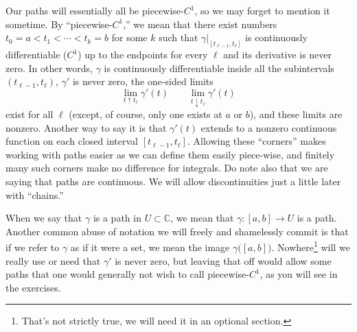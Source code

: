 \documentclass[12pt,openany]{book}
\newcommand{\C}{{\mathbb{C}}}
\newcommand{\myquote}[1]{``#1''}
\theoremstyle{plain}
\theoremstyle{remark}
\theoremstyle{definition}
\theoremstyle{exercise}
\theoremstyle{example}
\begin{document}
Our paths will essentially all be piecewise-$C^1$,
so we may forget to mention it sometime.
By \myquote{piecewise-$C^1$,}
we mean that there exist numbers $t_0 = a < t_1 < \cdots
< t_k = b$ for some $k$ such that $\gamma|_{[t_{\ell-1},t_\ell]}$ is
continuously differentiable ($C^1$) up to
the endpoints for every $\ell$ and its derivative is never zero.
In other words, $\gamma$ is continuously differentiable inside all the
subintervals $(t_{\ell-1},t_\ell)$, $\gamma'$ is never zero, the one-sided limits
\begin{equation*}
\lim_{t \uparrow t_\ell} \gamma'(t) \qquad
\lim_{t \downarrow t_\ell} \gamma'(t)
\end{equation*}
exist for all $\ell$ (except, of course, only one exists at $a$ or $b$),
and these limits are nonzero.
Another way to say it is that $\gamma'(t)$ extends to a nonzero
continuous function on each closed interval $[t_{\ell-1},t_{\ell}]$.
Allowing these \myquote{corners} makes working with paths easier
as we can define them easily piece-wise, and finitely many such corners
make no difference for integrals.
Do note also that we are saying that paths are continuous.  We will allow
discontinuities just a little later with \myquote{chains.}

When we say that $\gamma$ is a path in $U \subset \C$,
we mean that
$\gamma \colon [a,b] \to U$ is a path.  Another common abuse of notation we
will freely and shamelessly commit is that if we refer to $\gamma$
as if it were a set, we mean the image $\gamma\bigl([a,b]\bigr)$.
Nowhere\footnote{That's not strictly true, we will need it in an optional
section.} will we really use or need that $\gamma'$ is never zero,
but leaving that off would allow some paths that one would generally not
wish to call piecewise-$C^1$,
as you will see in the exercises.
\end{document}
